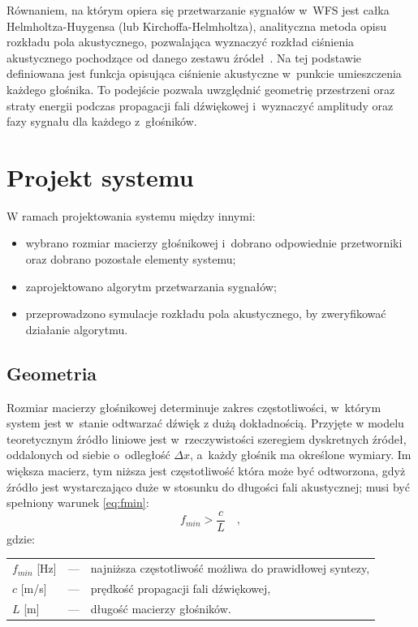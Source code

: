 \documentclass[10pt, a4paper]{article}
\let\Oldsection\section
\renewcommand{\section}{\FloatBarrier\Oldsection}
\let\Oldsubsection\subsection
\renewcommand{\subsection}{\FloatBarrier\Oldsubsection}
\begin{document}
Równaniem, na którym opiera się przetwarzanie sygnałów w~WFS jest całka Helmholtza-Huygensa
(lub Kirchoffa-Helmholtza), analityczna metoda opisu rozkładu pola akustycznego,
pozwalająca wyznaczyć rozkład ciśnienia akustycznego pochodzące od danego zestawu
źródeł~\cite{snaka}. Na tej podstawie definiowana jest funkcja opisująca ciśnienie akustyczne 
w~punkcie umieszczenia każdego głośnika. To podejście pozwala uwzględnić geometrię
przestrzeni oraz straty energii podczas propagacji fali dźwiękowej i~wyznaczyć
amplitudy oraz fazy sygnału dla każdego z~głośników. 

\section{Projekt systemu}

W ramach projektowania systemu między innymi:
\begin{itemize}
  \item wybrano rozmiar macierzy głośnikowej i~dobrano odpowiednie przetworniki
    oraz dobrano pozostałe elementy systemu;
  \item zaprojektowano algorytm przetwarzania sygnałów;
  \item przeprowadzono symulacje rozkładu pola akustycznego, by zweryfikować działanie algorytmu.
\end{itemize}

\subsection{Geometria}

Rozmiar macierzy głośnikowej determinuje zakres częstotliwości, w~którym system
jest w~stanie odtwarzać dźwięk z dużą dokładnością. Przyjęte w modelu teoretycznym 
źródło liniowe jest w~rzeczywistości szeregiem dyskretnych źródeł, oddalonych od siebie 
o~odległość $\Delta x$, a~każdy głośnik ma określone wymiary. Im większa macierz, tym niższa 
jest częstotliwość która może być odtworzona, gdyż źródło jest wystarczająco duże w stosunku 
do długości fali akustycznej; musi być spełniony warunek \eqref{eq:fmin}:
\begin{equation}
  f_{min}>\frac{c}{L} \quad,	\label{eq:fmin}
\end{equation}
gdzie:\\
\indent \begin{tabular}{l c l}
  $f_{min}$ [\si{\hertz}] & --- & najniższa częstotliwość możliwa do prawidłowej syntezy, \\
  $c$ [\si[per-mode=symbol]{\metre\per\second}] & --- & prędkość propagacji fali dźwiękowej, \\
  $L$ [\si{\metre}] & --- & długość macierzy głośników. \\
\end{tabular}\\
\end{document}
